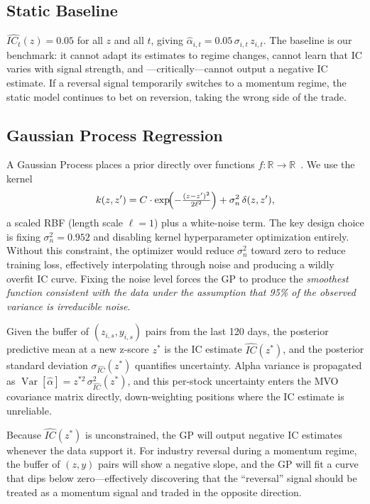 \documentclass[11pt]{amsart}
\begin{document}
\subsection{Static Baseline}

$\widehat{IC_t}(z) = 0.05$ for all $z$ and all $t$, giving
$\hat{\alpha}_{i,t} = 0.05\,\sigma_{i,t}\,z_{i,t}$.
The baseline is our benchmark: it cannot adapt its estimates to regime
changes, cannot learn that IC varies with signal strength, and
---critically---cannot output a negative IC estimate.  If a reversal signal
temporarily switches to a momentum regime, the static model continues to
bet on reversion, taking the wrong side of the trade.

\subsection{Gaussian Process Regression}

A Gaussian Process places a prior directly over functions $f \colon
\mathbb{R} \to \mathbb{R}$~\cite{RasmussenWilliams2006}.  We use the kernel
\[
  k(z, z') = C \cdot \exp\!\Bigl(-\tfrac{(z-z')^2}{2\ell^2}\Bigr)
             + \sigma_n^2\,\delta(z, z'),
\]
a scaled RBF (length scale $\ell = 1$) plus a white-noise term.  The key
design choice is fixing $\sigma_n^2 = 0.952$ and disabling kernel
hyperparameter optimization entirely.  Without this constraint, the
optimizer would reduce $\sigma_n^2$ toward zero to reduce training loss,
effectively interpolating through noise and producing a wildly overfit IC
curve.  Fixing the noise level forces the GP to produce the \emph{smoothest
function consistent with the data under the assumption that 95\% of the
observed variance is irreducible noise}.

Given the buffer of $(z_{i,s}, y_{i,s})$ pairs from the last 120 days,
the posterior predictive mean at a new z-score $z^*$ is the IC estimate
$\widehat{IC}(z^*)$, and the posterior standard deviation
$\sigma_{\widehat{IC}}(z^*)$ quantifies uncertainty.
Alpha variance is propagated as
$\operatorname{Var}[\hat{\alpha}] = z^{*2}\,\sigma_{\widehat{IC}}^2(z^*)$,
and this per-stock uncertainty enters the MVO covariance matrix directly,
down-weighting positions where the IC estimate is unreliable.

Because $\widehat{IC}(z^*)$ is unconstrained, the GP will output negative
IC estimates whenever the data support it.  For industry reversal during a
momentum regime, the buffer of $(z, y)$ pairs will show a negative slope,
and the GP will fit a curve that dips below zero---effectively discovering
that the ``reversal'' signal should be treated as a momentum signal and
traded in the opposite direction.
\end{document}
